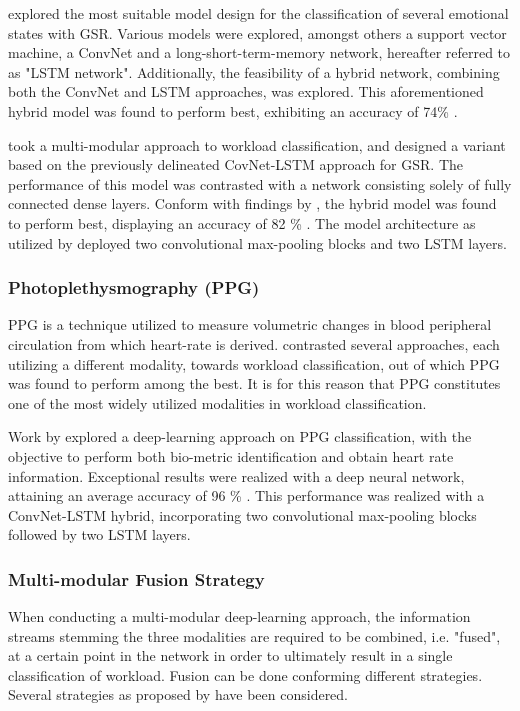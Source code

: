 \documentclass[12pt]{article}
\begin{document}
 explored the most suitable model design for the classification of several emotional states with GSR. Various models were explored, amongst others a support vector machine, a ConvNet and a long-short-term-memory network, hereafter referred to as "LSTM network". Additionally, the feasibility of a hybrid network, combining both the ConvNet and LSTM approaches, was explored. This aforementioned hybrid model was found to perform best, exhibiting an accuracy of 74\% \cite{sun2019hybrid}. 

 took a multi-modular approach to workload classification, and designed a variant based on the previously delineated CovNet-LSTM approach for GSR. The performance of this model was contrasted with a network consisting solely of fully connected dense layers. Conform with findings by  , the hybrid model was found to perform best, displaying an accuracy of 82 \% \cite{dolmans2020perceived}. The model architecture as utilized by  deployed two convolutional max-pooling blocks and two LSTM layers.

\subsubsection{Photoplethysmography (PPG)}
PPG is a technique utilized to measure volumetric changes in blood peripheral circulation from which heart-rate is derived.  contrasted several approaches, each utilizing a different modality, towards workload classification, out of which PPG was found to perform among the best. It is for this reason that PPG constitutes one of the most widely utilized modalities in workload classification. 

Work by  explored a deep-learning approach on PPG classification, with the objective to perform both bio-metric identification and obtain heart rate information. Exceptional results were realized with a deep neural network, attaining an average accuracy of 96 \% \cite{biswas2019cornet}. This performance was realized with a ConvNet-LSTM hybrid, incorporating two convolutional max-pooling blocks followed by two LSTM layers. 

\subsubsection{Multi-modular Fusion Strategy}  
When conducting a multi-modular deep-learning approach, the information streams stemming the three modalities are required to be combined, i.e. "fused", at a certain point in the network in order to ultimately result in a single classification of workload. Fusion can be done conforming different strategies. Several strategies as proposed by  have been considered.
\end{document}
